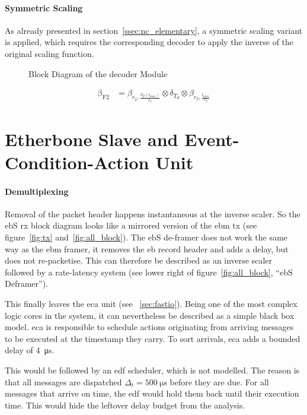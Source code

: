 \paragraph{Symmetric Scaling}
As already presented in section~\ref{ssec:nc_elementary}, a symmetric scaling variant is applied, which requires the
corresponding decoder to apply the inverse of the original scaling function.
\begin{figure}[H]
  \centering
  \def\svgwidth{0.6875\textwidth}
  
  \caption{Block Diagram of the decoder Module}
  \label{fig:dfec}
\end{figure}
%
\begin{align}
\mathrm{\beta_{F2}} &= \beta_{r_2,\frac{S_F\left(l_{max}\right)}{r_2}} \otimes \delta_{T_d} \otimes \beta_{r_2,\frac{l_{max}}{r_2}}
\label{eq:delay_p_framer}
\end{align}
%

\section{Etherbone Slave and Event-Condition-Action Unit}

\paragraph{Demultiplexing}
Removal of the packet header happens instantaneous at the inverse scaler.
So the \gls{eb}S \gls{rx} block diagram looks like a mirrored version of the \gls{ebm} \gls{tx} (see figure~\ref{fig:tx} and~\ref{fig:all_block}).
The \gls{eb}S de-framer does not work the same way as the \gls{ebm} framer, it removes the \gls{eb} record header and adds a delay, but does not re-packetise.
This can therefore be described as an inverse scaler followed by a rate-latency system (see lower right of figure~\ref{fig:all_block}, \enquote{\gls{eb}S Deframer}).
\par
This finally leaves the \gls{eca} unit (see ~\ref{sec:fastio}). Being one of the most complex logic cores in the system, it can nevertheless be described as a simple black box model.
\gls{eca} is responsible to schedule actions originating from arriving messages to be executed at the timestamp they carry. To sort
arrivals, \gls{eca} adds a bounded delay of \SI{4}{\micro\second}.
\par
This would be followed by an \gls{edf} scheduler, which is not modelled. The reason is that all messages are dispatched $\Delta_t = \SI{500}{\micro\second}$ before they are due.
For all messages that arrive on time, the \gls{edf} would hold them back until their execution time. This would hide the leftover delay budget from the analysis.

